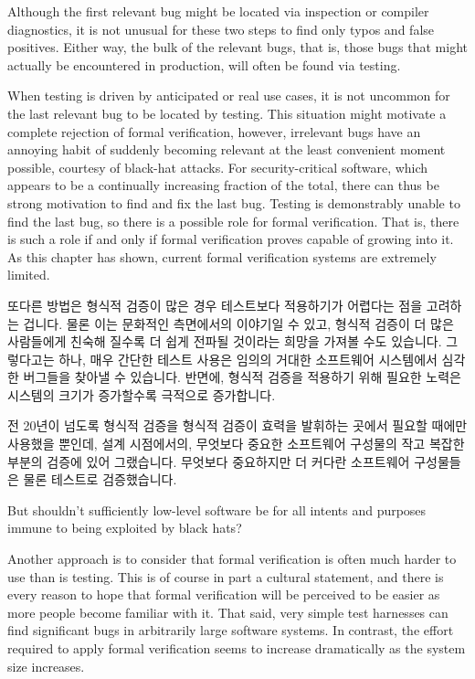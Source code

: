 Although the first relevant bug might be located via inspection or
compiler diagnostics, it is not unusual for these two steps to find
only typos and false positives.
Either way, the bulk of the relevant bugs, that is, those bugs that
might actually be encountered in production, will often be found via testing.

When testing is driven by anticipated or real use cases, it is not
uncommon for the last relevant bug to be located by testing.
This situation might motivate a complete rejection of formal verification,
however, irrelevant bugs have an annoying habit of suddenly becoming relevant
at the least convenient moment possible, courtesy of black-hat attacks.
For security-critical software, which appears to be a continually
increasing fraction of the total, there can thus be strong motivation
to find and fix the last bug.
Testing is demonstrably unable to find the last bug, so there is a
possible role for formal verification.
That is, there is such a role if and only if formal verification
proves capable of growing into it.
As this chapter has shown, current formal verification systems are
extremely limited.
\fi

또다른 방법은 형식적 검증이 많은 경우 테스트보다 적용하기가 어렵다는 점을
고려하는 겁니다.
물론 이는 문화적인 측면에서의 이야기일 수 있고, 형식적 검증이 더 많은
사람들에게 친숙해 질수록 더 쉽게 전파될 것이라는 희망을 가져볼 수도 있습니다.
그렇다고는 하나, 매우 간단한 테스트 사용은 임의의 거대한 소프트웨어 시스템에서
심각한 버그들을 찾아낼 수 있습니다.
반면에, 형식적 검증을 적용하기 위해 필요한 노력은 시스템의 크기가 증가할수록
극적으로 증가합니다.

전 20년이 넘도록 형식적 검증을 형식적 검증이 효력을 발휘하는 곳에서 필요할
때에만 사용했을 뿐인데, 설계 시점에서의, 무엇보다 중요한 소프트웨어 구성물의
작고 복잡한 부분의 검증에 있어 그랬습니다.
무엇보다 중요하지만 더 커다란 소프트웨어 구성물들은 물론 테스트로 검증했습니다.
\iffalse

\QuickQuiz{}
	But shouldn't sufficiently low-level software be for all intents
	and purposes immune to being exploited by black hats?
 \QuickQuizEnd

Another approach is to consider that
formal verification is often much harder to use than is testing.
This is of course in part a cultural statement, and there is every reason
to hope that formal verification will be perceived to be easier as more
people become familiar with it.
That said, very simple test harnesses can find significant bugs in arbitrarily
large software systems.
In contrast, the effort required to apply formal verification seems to
increase dramatically as the system size increases.

